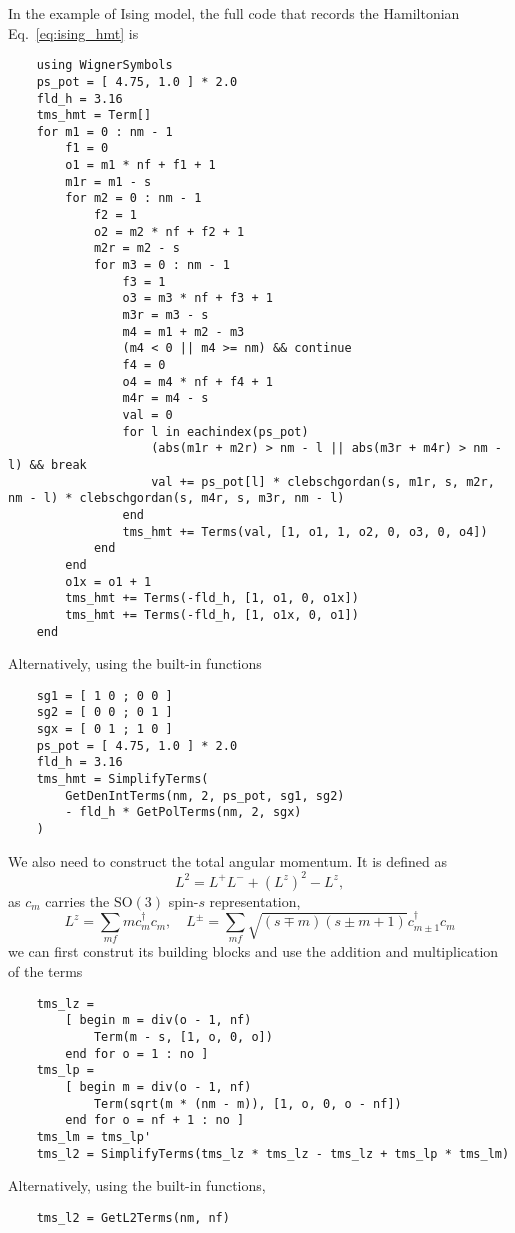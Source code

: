 \documentclass{timesjhep}
\begin{document}
In the example of Ising model, the full code that records the Hamiltonian Eq.~\eqref{eq:ising_hmt} is 
\begin{lstlisting}
    using WignerSymbols
    ps_pot = [ 4.75, 1.0 ] * 2.0
    fld_h = 3.16
    tms_hmt = Term[]
    for m1 = 0 : nm - 1
        f1 = 0
        o1 = m1 * nf + f1 + 1
        m1r = m1 - s
        for m2 = 0 : nm - 1
            f2 = 1
            o2 = m2 * nf + f2 + 1
            m2r = m2 - s
            for m3 = 0 : nm - 1
                f3 = 1
                o3 = m3 * nf + f3 + 1
                m3r = m3 - s
                m4 = m1 + m2 - m3 
                (m4 < 0 || m4 >= nm) && continue
                f4 = 0
                o4 = m4 * nf + f4 + 1
                m4r = m4 - s
                val = 0
                for l in eachindex(ps_pot)
                    (abs(m1r + m2r) > nm - l || abs(m3r + m4r) > nm - l) && break 
                    val += ps_pot[l] * clebschgordan(s, m1r, s, m2r, nm - l) * clebschgordan(s, m4r, s, m3r, nm - l)
                end 
                tms_hmt += Terms(val, [1, o1, 1, o2, 0, o3, 0, o4])
            end
        end
        o1x = o1 + 1
        tms_hmt += Terms(-fld_h, [1, o1, 0, o1x])
        tms_hmt += Terms(-fld_h, [1, o1x, 0, o1])
    end
\end{lstlisting}
Alternatively, using the built-in functions
\begin{lstlisting}
    sg1 = [ 1 0 ; 0 0 ]
    sg2 = [ 0 0 ; 0 1 ]
    sgx = [ 0 1 ; 1 0 ]
    ps_pot = [ 4.75, 1.0 ] * 2.0
    fld_h = 3.16
    tms_hmt = SimplifyTerms(
        GetDenIntTerms(nm, 2, ps_pot, sg1, sg2)
        - fld_h * GetPolTerms(nm, 2, sgx) 
    )
\end{lstlisting}

We also need to construct the total angular momentum. It is defined as 
\begin{equation}
    L^2=L^+L^-+(L^z)^2-L^z,
\end{equation}
as $c_m$ carries the $\mathrm{SO}(3)$ spin-$s$ representation, 
\begin{equation}
    L^z=\sum_{mf}mc_m^\dagger c_m,\quad L^\pm=\sum_{mf}\sqrt{(s\mp m)(s\pm m+1)}c^\dagger_{m\pm 1}c_m
\end{equation}
we can first construt its building blocks and use the addition and multiplication of the terms
\begin{lstlisting}
    tms_lz = 
        [ begin m = div(o - 1, nf)
            Term(m - s, [1, o, 0, o])
        end for o = 1 : no ]
    tms_lp = 
        [ begin m = div(o - 1, nf)
            Term(sqrt(m * (nm - m)), [1, o, 0, o - nf])
        end for o = nf + 1 : no ]
    tms_lm = tms_lp' 
    tms_l2 = SimplifyTerms(tms_lz * tms_lz - tms_lz + tms_lp * tms_lm)
\end{lstlisting}
Alternatively, using the built-in functions,
\begin{lstlisting}
    tms_l2 = GetL2Terms(nm, nf)
\end{lstlisting}
\end{document}
